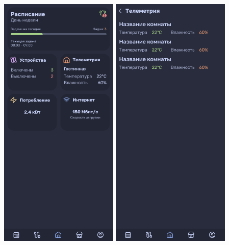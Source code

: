 \documentclass[a4paper,12pt]{article}
\begin{document}
\begin{center}
  \includegraphics[width=0.425\textwidth]{pics/Main Page.png}
  \includegraphics[width=0.425\textwidth]{pics/Telemetry Page.png}
\end{center}
\end{document}
